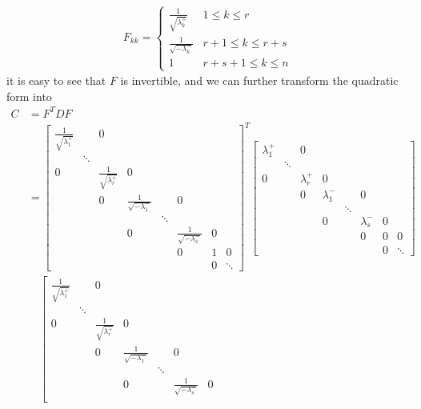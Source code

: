 \begin{align}
F_{kk} = 
\begin{cases}
\frac{1}{\sqrt{\lambda_{k}^+}} & 1 \leq k \leq r \\
\frac{1}{\sqrt{-\lambda_{k}^-}} & r+1 \leq k \leq r+s \\
1 & r+s+1 \leq k \leq n
\end{cases}
\end{align}
it is easy to see that $F$ is invertible, and we can further transform the quadratic form into
\begin{align*}
C &= F^TDF \\
&= \left[\begin{smallmatrix}
\frac{1}{\sqrt{\lambda_{1}^+}} & & 0 & & & & &\\
 & \ddots & & & & & & \\
0 & & \frac{1}{\sqrt{\lambda_{r}^+}} & 0 & & & &\\
 & & 0 & \frac{1}{\sqrt{-\lambda_{1}^-}} & & 0 & & \\
 & & & & \ddots & & & \\
 & & & 0 & & \frac{1}{\sqrt{-\lambda_{s}^-}} & 0 &  \\
 & & & & & 0 & 1 & 0\\
 & & & & & & 0 & \ddots
\end{smallmatrix}\right]^T
\left[\begin{smallmatrix}
\lambda_1^+ & & 0 & & & & &\\
 & \ddots & & & & & & \\
0 & & \lambda_{r}^+ & 0 & & & &\\
 & & 0 & \lambda_{1}^- & & 0 & & \\
 & & & & \ddots & & & \\
 & & & 0 & & \lambda_{s}^- & 0 &  \\
 & & & & & 0 & 0 & 0\\
 & & & & & & 0 & \ddots
\end{smallmatrix}\right] \\
& \quad \left[\begin{smallmatrix}
\frac{1}{\sqrt{\lambda_{1}^+}} & & 0 & & & & &\\
 & \ddots & & & & & & \\
0 & & \frac{1}{\sqrt{\lambda_{r}^+}} & 0 & & & &\\
 & & 0 & \frac{1}{\sqrt{-\lambda_{1}^-}} & & 0 & & \\
 & & & & \ddots & & & \\
 & & & 0 & & \frac{1}{\sqrt{-\lambda_{s}^-}} & 0 &  \\

\end{smallmatrix}
\end{align*}
